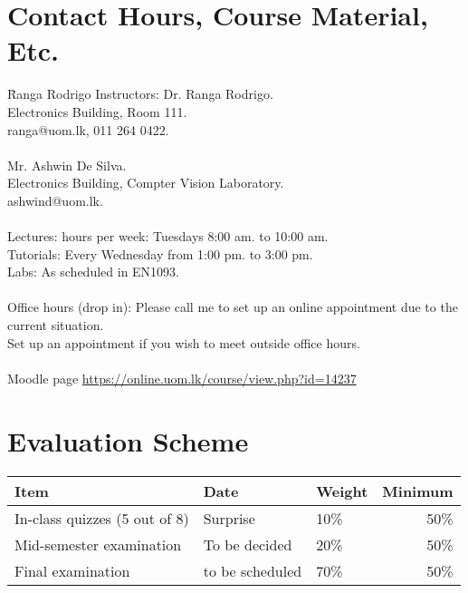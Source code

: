 \documentclass[11pt, a4paper]{article}
\begin{document}
\section{Contact Hours, Course Material, Etc.}
\begin{tabbing}
  \hspace{2in}\= Ranga Rodrigo \kill
  Instructors: \>  Dr. Ranga Rodrigo.\\
  \> Electronics Building, Room 111.\\
                \> ranga@uom.lk, 011 264 0422.\\
                \\
                 \>  Mr. Ashwin De Silva.\\
  \> Electronics Building, Compter Vision Laboratory.\\
                \> ashwind@uom.lk.\\
                \\
  Lectures:  hours per week: Tuesdays 8:00 am. to 10:00 am.\\
  Tutorials: \> Every Wednesday from 1:00 pm. to 3:00 pm.\\
  Labs: \> As scheduled in EN1093.\\
  \\
  Office hours (drop in): \> Please call me to set up an online appointment due to the current situation.\\
  \> Set up an appointment if you wish to meet outside office hours.\\
  \\
  Moodle page \>
  \href{https://online.uom.lk/course/view.php?id=14237}{https://online.uom.lk/course/view.php?id=14237}

\end{tabbing}

\section{Evaluation Scheme}
\begin{table}[h!]
\begin{tabular}{@{}lllr@{}}
  \toprule
  Item   & Date& Weight& Minimum\\
  \midrule
  In-class quizzes (5 out of 8) & Surprise & 10\% & 50\%\\

  Mid-semester examination  &  To be decided& 20\% & 50\%\\

  Final examination & to be scheduled & 70\% & 50\%\\
  \bottomrule
\end{tabular}
\end{table}
\end{document}

